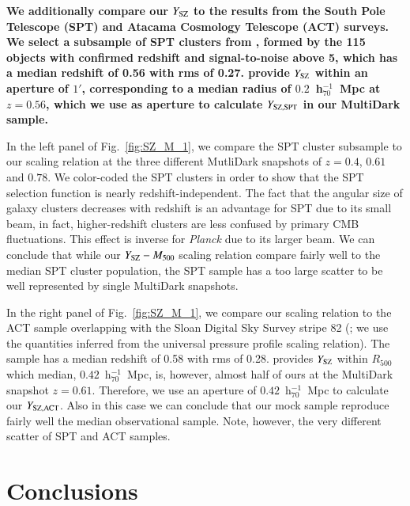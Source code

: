 \documentclass[useAMS,usenatbib]{mn2e}
\begin{document}
{\bf We additionally compare our $Y_{{\mathrm{SZ}}}$ to the results from the South Pole Telescope (SPT) 
and Atacama Cosmology Telescope (ACT) surveys.
We select a subsample of SPT clusters from \cite{2013ApJ...763..127R}, formed by the
115 objects with confirmed redshift and signal-to-noise above 5, which has a median
redshift of 0.56 with rms of 0.27. \cite{2013ApJ...763..127R} provide $Y_{{\mathrm{SZ}}}$ 
within an aperture of $1'$, corresponding to a median radius of $0.2$~h$_{70}^{-1}$~Mpc 
at $z = 0.56$, which we use as aperture to calculate $Y_{{\mathrm{SZ, SPT}}}$ in our MultiDark sample.

In the left panel of Fig.~\ref{fig:SZ_M_1}, we compare the SPT cluster subsample to our 
scaling relation at the three different MutliDark snapshots of $z = 0.4$, $0.61$ 
and $0.78$. We color-coded the SPT clusters in order to show that the SPT 
selection function is nearly redshift-independent. The fact that the angular size of galaxy clusters 
decreases with redshift is an advantage for SPT due to its small beam, in fact, higher-redshift clusters 
are less confused by primary CMB fluctuations. This effect is inverse for \emph{Planck} due to its
larger beam. We can conclude that while our $Y_{{\mathrm{SZ}}}-M_{500}$ scaling relation 
compare fairly well to the median SPT cluster population, the SPT sample has a too
large scatter to be well represented by single MultiDark snapshots.

In the right panel of Fig.~\ref{fig:SZ_M_1}, we compare our scaling relation to
the ACT sample overlapping with the Sloan Digital Sky Survey stripe 82 
(\citealp{2013JCAP...07..008H}; we use the quantities inferred from the
universal pressure profile scaling relation).
The sample has a median redshift of 0.58 with rms of 0.28.
\cite{2013JCAP...07..008H} provides $Y_{{\mathrm{SZ}}}$ within $R_{500}$ which
median, $0.42$~h$_{70}^{-1}$~Mpc, is, however, almost half of ours at the
MultiDark snapshot $z=0.61$. Therefore, we use an aperture of $0.42$~h$_{70}^{-1}$~Mpc
to calculate our $Y_{{\mathrm{SZ, ACT}}}$. Also in this case we can conclude
that our mock sample reproduce fairly well the median observational sample. 
Note, however, the very different scatter of SPT and ACT samples.} 

\section{Conclusions}
\label{sec:6}
\end{document}
